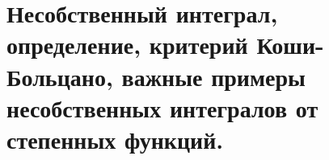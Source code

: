 \documentclass[../main.tex]{subfiles}
\begin{document}
\newpage
\section{Несобственный интеграл, определение, критерий Коши-Больцано, важные примеры несобственных интегралов от степенных функций.}
\end{document}
